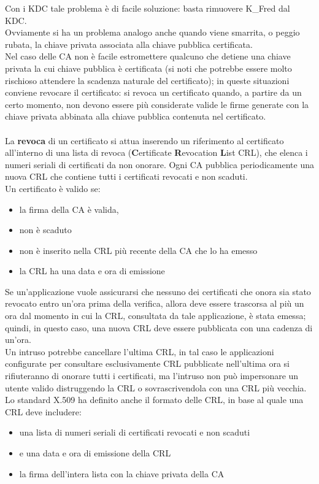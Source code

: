 Con i KDC tale problema è di facile soluzione: basta rimuovere K_{Fred} dal KDC.\\ 
Ovviamente si ha un problema analogo anche quando viene smarrita, o peggio rubata, la chiave privata associata alla chiave pubblica certificata.\\
Nel caso delle CA non è facile estromettere qualcuno che detiene una chiave privata la cui chiave pubblica è certificata (si noti che potrebbe essere molto rischioso attendere la scadenza naturale del certificato); in queste situazioni conviene revocare il certificato: si revoca un certificato quando, a partire da un certo momento, non devono essere più considerate valide le firme generate con la chiave privata abbinata alla chiave pubblica contenuta nel certificato. \\ \\
La \textbf{revoca} di un certificato si attua inserendo un riferimento al certificato all'interno di una lista di revoca (\textbf{C}ertificate \textbf{R}evocation \textbf{L}ist CRL), che elenca i numeri seriali di certificati da non onorare. Ogni CA pubblica periodicamente una nuova CRL che contiene tutti i certificati revocati e non scaduti.\\
Un certificato è valido se:
\begin{itemize}
\item la firma della CA è valida,
\item non è scaduto
\item non è inserito nella CRL più recente della CA che lo ha emesso
\item la CRL ha una data e ora di emissione
\end{itemize}
Se un'applicazione vuole assicurarsi che nessuno dei certificati che onora sia stato revocato entro un'ora prima
della verifica, allora deve essere trascorsa al più un ora dal momento in cui la CRL, consultata da tale applicazione, è stata emessa; quindi, in questo caso, una nuova CRL deve essere pubblicata con una cadenza di un'ora.\\
Un intruso potrebbe cancellare l'ultima CRL, in tal caso le applicazioni configurate per consultare esclusivamente CRL pubblicate nell'ultima ora si rifiuteranno di onorare tutti i certificati, ma l'intruso non può impersonare un utente valido distruggendo la CRL o sovrascrivendola con una CRL più vecchia.\\
Lo standard X.509 ha definito anche il formato delle CRL, in base al quale una CRL deve includere:
\begin{itemize}
\item una lista di numeri seriali di certificati revocati e non scaduti
\item e una data e ora di emissione della CRL
\item la firma dell'intera lista con la chiave privata della CA
\end{itemize}
